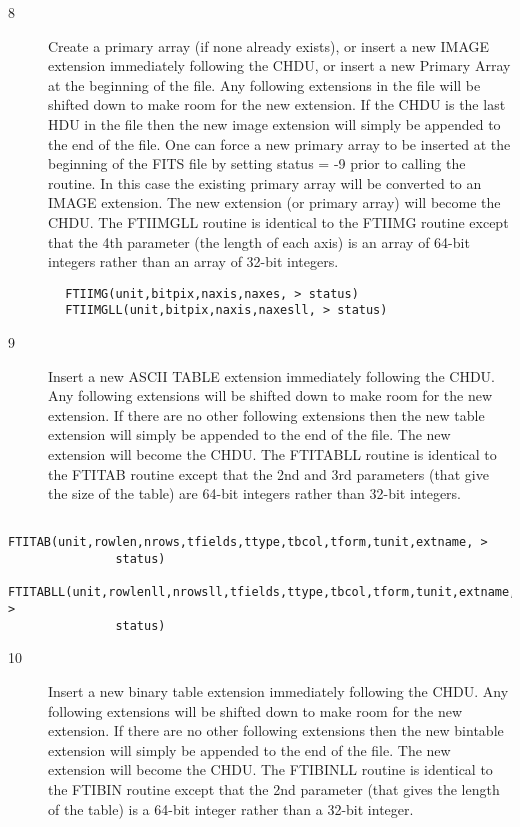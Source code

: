 \documentclass[11pt]{book}
\begin{document}
\begin{description}
\item[8 ] Create a primary array (if none already exists), or insert a
    new IMAGE extension immediately following the CHDU, or
    insert a new Primary Array at the beginning of the file.  Any
    following extensions in the file will be shifted down to make room
    for the new extension.  If the CHDU is the last HDU in the file
    then the new image extension will simply be appended to the end of
    the file.   One can force a new primary array to be inserted at the
    beginning of the FITS file by setting status = -9 prior
    to calling the routine.  In this case the existing primary array will be
    converted to an IMAGE extension. The new extension (or primary
    array) will become the CHDU.  The FTIIMGLL routine is identical
    to the FTIIMG routine except that the 4th parameter (the length
    of each axis) is an array of 64-bit integers rather than an array
   of 32-bit integers.
\end{description}

\begin{verbatim}
        FTIIMG(unit,bitpix,naxis,naxes, > status)
        FTIIMGLL(unit,bitpix,naxis,naxesll, > status)
\end{verbatim}

\begin{description}
\item[9 ] Insert a new ASCII TABLE extension immediately following the CHDU.
    Any following extensions will be shifted down to make room for
    the new extension.  If there are no other following extensions
    then the new table extension will simply be appended to the
    end of the file.  The new extension will become the CHDU. The FTITABLL
    routine is identical
    to the FTITAB routine except that the 2nd and 3rd parameters (that give
    the size of the table) are 64-bit integers rather than
   32-bit integers.
\end{description}

\begin{verbatim}
        FTITAB(unit,rowlen,nrows,tfields,ttype,tbcol,tform,tunit,extname, >
               status)
        FTITABLL(unit,rowlenll,nrowsll,tfields,ttype,tbcol,tform,tunit,extname, >
               status)
\end{verbatim}


\begin{description}
\item[10]  Insert a new binary table extension immediately following the CHDU.
    Any following extensions will be shifted down to make room for
    the new extension.  If there are no other following extensions
    then the new bintable extension will simply be appended to the
    end of the file.  The new extension will become the CHDU. The FTIBINLL
    routine is identical
    to the FTIBIN routine except that the 2nd parameter (that gives
    the length of the table) is a 64-bit integer rather than
   a 32-bit integer.
\end{description}
\end{document}
